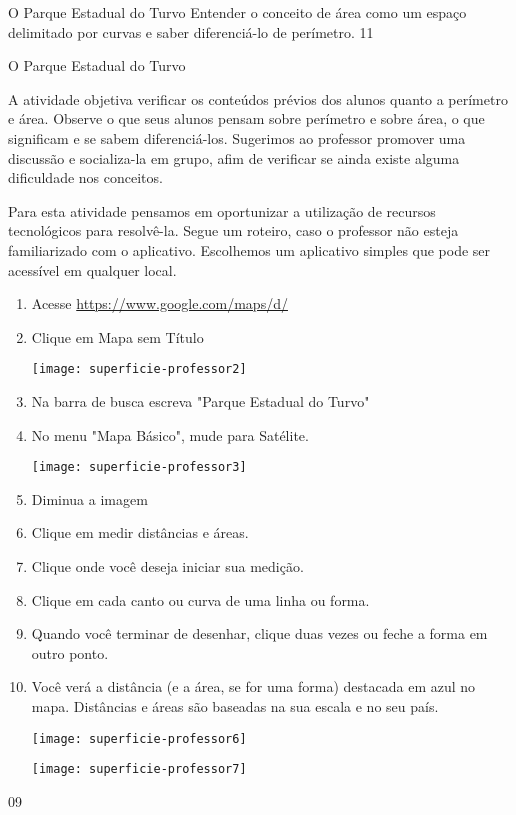 \cleardoublepage
\def\currentcolor{session1}
\begin{objectives}{O Parque Estadual do Turvo}
{
Entender o conceito de área como um espaço delimitado por curvas e saber diferenciá-lo de perímetro.
}{1}{1}
\end{objectives}
\begin{sugestions}{O Parque Estadual do Turvo}{
A atividade objetiva verificar os conteúdos prévios dos alunos quanto a perímetro e área. Observe o que seus alunos pensam sobre perímetro e sobre área, o que significam e se sabem diferenciá-los. Sugerimos ao professor promover uma discussão e socializa-la em grupo, afim de verificar se ainda existe alguma dificuldade nos conceitos.

Para esta atividade pensamos em oportunizar a utilização de recursos tecnológicos para resolvê-la. Segue um roteiro, caso o professor não esteja familiarizado com o aplicativo. Escolhemos um aplicativo simples que pode ser acessível em qualquer local.



\begin{enumerate}
\item Acesse \url{https://www.google.com/maps/d/} 
\item Clique em Mapa sem Título

\texttt{[image: superficie-professor2]}
\item Na barra de busca escreva "Parque Estadual do Turvo"
\item No menu "Mapa Básico", mude para Satélite.


\texttt{[image: superficie-professor3]}


\item Diminua a imagem
\begin{figure}[H]
\centering

\end{figure}

\item Clique em medir distâncias e áreas.

\item Clique onde você deseja iniciar sua medição.
\item Clique em cada canto ou curva de uma linha ou forma.
\item Quando você terminar de desenhar, clique duas vezes ou feche a forma em outro ponto.
\item Você verá a distância (e a área, se for uma forma) destacada em azul no mapa. Distâncias e áreas são baseadas na sua escala e no seu país.

\centering
\texttt{[image: superficie-professor6]}

\texttt{[image: superficie-professor7]}

\end{enumerate}
}{0}{9}
\end{sugestions}
